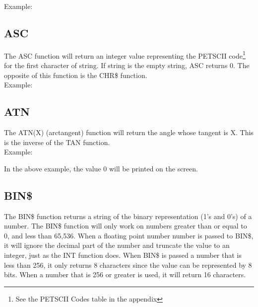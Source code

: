 Example:\\


\subsection{ASC}

The {\ttfamily ASC} function will return an integer value representing the
PETSCII code\footnote{See the PETSCII Codes table in the appendix} for the
first character of string.  If string is the empty string, {\ttfamily ASC}
returns 0.  The opposite of this function is the {\ttfamily CHR\$} function.\\

Example:\\


\subsection{ATN}

The {\ttfamily ATN(X)} (arctangent) function will return the angle whose
tangent is {\ttfamily X}.  This is the inverse of the {\ttfamily TAN}
function.\\

Example:\\


In the above example, the value 0 will be printed on the screen.\\

\subsection{BIN\$}

The {\ttfamily BIN\$} function returns a string of the binary representation
(1's and 0's) of a number.  The {\ttfamily BIN\$} function will only work on
numbers greater than or equal to 0, and less than 65,536.  When a floating
point number number is passed to {\ttfamily BIN\$}, it will ignore the decimal
part of the number and truncate the value to an integer, just as the {\ttfamily
INT} function does.  When {\ttfamily BIN\$} is passed a number that is less
than 256, it only returns 8 characters since the value can be represented by 8
bits.  When a number that is 256 or greater is used, it will return 16
characters.\\

